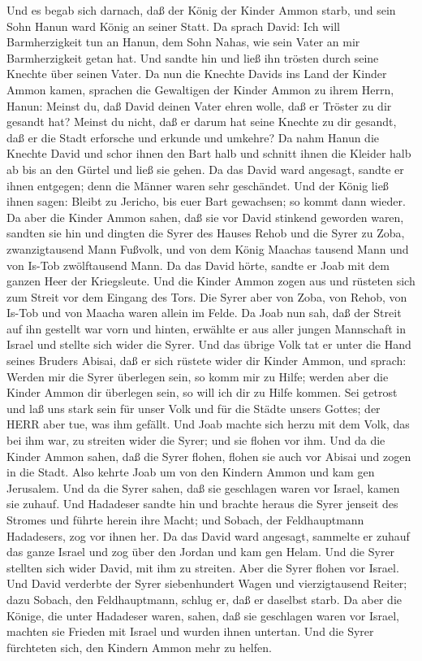  Und es begab sich darnach, daß der König der Kinder Ammon
starb, und sein Sohn Hanun ward König an seiner Statt.  Da
sprach David: Ich will Barmherzigkeit tun an Hanun, dem Sohn Nahas, wie
sein Vater an mir Barmherzigkeit getan hat. Und sandte hin und ließ ihn
trösten durch seine Knechte über seinen Vater. Da nun die Knechte Davids
ins Land der Kinder Ammon kamen,  sprachen die Gewaltigen
der Kinder Ammon zu ihrem Herrn, Hanun: Meinst du, daß David deinen
Vater ehren wolle, daß er Tröster zu dir gesandt hat? Meinst du nicht,
daß er darum hat seine Knechte zu dir gesandt, daß er die Stadt
erforsche und erkunde und umkehre?  Da nahm Hanun die
Knechte David und schor ihnen den Bart halb und schnitt ihnen die
Kleider halb ab bis an den Gürtel und ließ sie gehen.  Da
das David ward angesagt, sandte er ihnen entgegen; denn die Männer waren
sehr geschändet. Und der König ließ ihnen sagen: Bleibt zu Jericho, bis
euer Bart gewachsen; so kommt dann wieder.  Da aber die
Kinder Ammon sahen, daß sie vor David stinkend geworden waren, sandten
sie hin und dingten die Syrer des Hauses Rehob und die Syrer zu Zoba,
zwanzigtausend Mann Fußvolk, und von dem König Maachas tausend Mann und
von Is-Tob zwölftausend Mann.  Da das David hörte, sandte er
Joab mit dem ganzen Heer der Kriegsleute.  Und die Kinder
Ammon zogen aus und rüsteten sich zum Streit vor dem Eingang des Tors.
Die Syrer aber von Zoba, von Rehob, von Is-Tob und von Maacha waren
allein im Felde.  Da Joab nun sah, daß der Streit auf ihn
gestellt war vorn und hinten, erwählte er aus aller jungen Mannschaft in
Israel und stellte sich wider die Syrer.  Und das übrige
Volk tat er unter die Hand seines Bruders Abisai, daß er sich rüstete
wider dir Kinder Ammon,  und sprach: Werden mir die Syrer
überlegen sein, so komm mir zu Hilfe; werden aber die Kinder Ammon dir
überlegen sein, so will ich dir zu Hilfe kommen.  Sei
getrost und laß uns stark sein für unser Volk und für die Städte unsers
Gottes; der HERR aber tue, was ihm gefällt.  Und Joab
machte sich herzu mit dem Volk, das bei ihm war, zu streiten wider die
Syrer; und sie flohen vor ihm.  Und da die Kinder Ammon
sahen, daß die Syrer flohen, flohen sie auch vor Abisai und zogen in die
Stadt. Also kehrte Joab um von den Kindern Ammon und kam gen Jerusalem.
 Und da die Syrer sahen, daß sie geschlagen waren vor
Israel, kamen sie zuhauf.  Und Hadadeser sandte hin und
brachte heraus die Syrer jenseit des Stromes und führte herein ihre
Macht; und Sobach, der Feldhauptmann Hadadesers, zog vor ihnen her.
 Da das David ward angesagt, sammelte er zuhauf das ganze
Israel und zog über den Jordan und kam gen Helam. Und die Syrer stellten
sich wider David, mit ihm zu streiten.  Aber die Syrer
flohen vor Israel. Und David verderbte der Syrer siebenhundert Wagen und
vierzigtausend Reiter; dazu Sobach, den Feldhauptmann, schlug er, daß er
daselbst starb.  Da aber die Könige, die unter Hadadeser
waren, sahen, daß sie geschlagen waren vor Israel, machten sie Frieden
mit Israel und wurden ihnen untertan. Und die Syrer fürchteten sich, den
Kindern Ammon mehr zu helfen.

